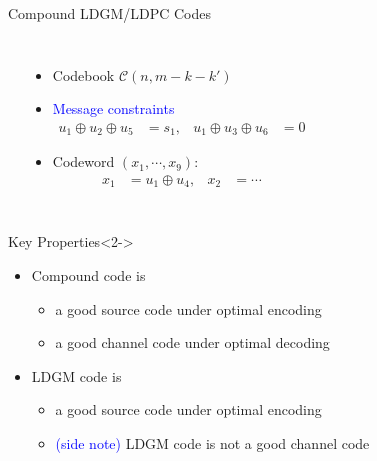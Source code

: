 \documentclass[10pt,presentation]{beamer}
\def\side_information_path{../compound-codes/isit14/slides/Figures}
\begin{document}
\begin{frame}{Compound LDGM/LDPC Codes}
  \begin{columns}
    \begin{center}
      \setlength\tikzheight{5cm}
      \setlength\tikzwidth{6cm}
      \scalebox{0.5}{}
    \end{center}
    \begin{itemize}
    \item Codebook $\mathcal{C}(n,m-k-k')$ \vspace{0.1cm}
    \item \textcolor{blue}{Message constraints} \vspace{-0.2cm}
      \begin{align*}
        u_1\oplus u_2 \oplus u_5&=s_1, &  u_1\oplus u_3 \oplus u_6&=0
      \end{align*}
    \item Codeword $(x_1,\cdots,x_9)$: \vspace{-0.2cm}
      \begin{align*}
        x_1 &= u_1 \oplus u_4, & x_2 &= \cdots
      \end{align*}
    \end{itemize}
  \end{columns}
  \begin{block}{Key Properties}<2->
    \begin{itemize}
    \item Compound code is 
      \begin{itemize}
      \item a \alert{good source code} under optimal encoding
      \item a \alert{good channel code} under optimal decoding
      \end{itemize}
     \item LDGM code is 
       \begin{itemize}
       \item a \alert{good source code} under optimal encoding
       \item \textcolor{blue}{(side note)} LDGM code is \alert{not} a good channel code
       \end{itemize}
    \end{itemize}
  \end{block}
\end{frame}
\end{document}
